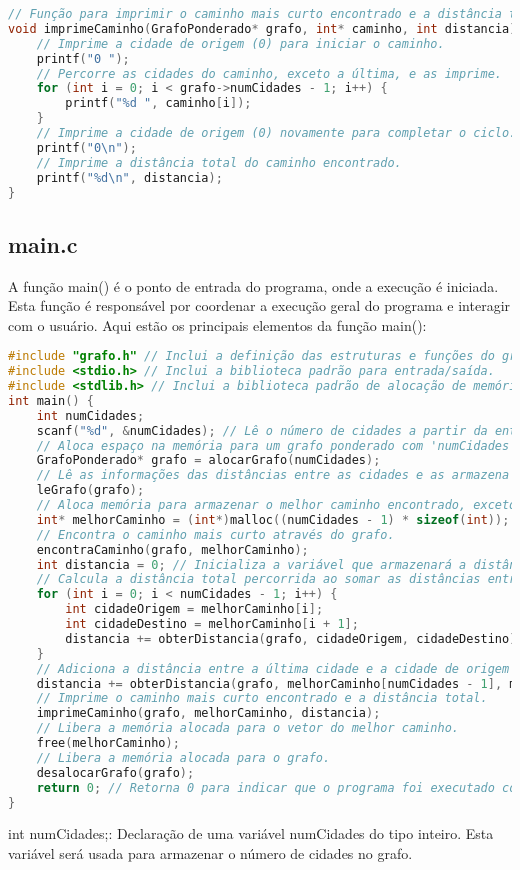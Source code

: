 \documentclass[12pt]{spieman}
\begin{document}
\begin{lstlisting}[language=C]
// Função para imprimir o caminho mais curto encontrado e a distância total.
void imprimeCaminho(GrafoPonderado* grafo, int* caminho, int distancia) {
    // Imprime a cidade de origem (0) para iniciar o caminho.
    printf("0 ");
    // Percorre as cidades do caminho, exceto a última, e as imprime.
    for (int i = 0; i < grafo->numCidades - 1; i++) {
        printf("%d ", caminho[i]);
    }
    // Imprime a cidade de origem (0) novamente para completar o ciclo.
    printf("0\n");
    // Imprime a distância total do caminho encontrado.
    printf("%d\n", distancia);
}
\end{lstlisting}
\subsection{main.c}
A função main() é o ponto de entrada do programa, onde a execução é iniciada. Esta função é responsável por coordenar a execução geral do programa e interagir com o usuário. Aqui estão os principais elementos da função main():
\begin{lstlisting}[language=C]
#include "grafo.h" // Inclui a definição das estruturas e funções do grafo.
#include <stdio.h> // Inclui a biblioteca padrão para entrada/saída.
#include <stdlib.h> // Inclui a biblioteca padrão de alocação de memória.
int main() {
    int numCidades;
    scanf("%d", &numCidades); // Lê o número de cidades a partir da entrada padrão.
    // Aloca espaço na memória para um grafo ponderado com 'numCidades'.
    GrafoPonderado* grafo = alocarGrafo(numCidades);
    // Lê as informações das distâncias entre as cidades e as armazena no grafo.
    leGrafo(grafo);
    // Aloca memória para armazenar o melhor caminho encontrado, exceto a cidade de origem.
    int* melhorCaminho = (int*)malloc((numCidades - 1) * sizeof(int));
    // Encontra o caminho mais curto através do grafo.
    encontraCaminho(grafo, melhorCaminho);
    int distancia = 0; // Inicializa a variável que armazenará a distância total do caminho.
    // Calcula a distância total percorrida ao somar as distâncias entre as cidades do caminho.
    for (int i = 0; i < numCidades - 1; i++) {
        int cidadeOrigem = melhorCaminho[i];
        int cidadeDestino = melhorCaminho[i + 1];
        distancia += obterDistancia(grafo, cidadeOrigem, cidadeDestino);
    }
    // Adiciona a distância entre a última cidade e a cidade de origem para fechar o ciclo.
    distancia += obterDistancia(grafo, melhorCaminho[numCidades - 1], melhorCaminho[0]);
    // Imprime o caminho mais curto encontrado e a distância total.
    imprimeCaminho(grafo, melhorCaminho, distancia);
    // Libera a memória alocada para o vetor do melhor caminho.
    free(melhorCaminho);
    // Libera a memória alocada para o grafo.
    desalocarGrafo(grafo);
    return 0; // Retorna 0 para indicar que o programa foi executado com sucesso.
}
\end{lstlisting}
int numCidades;: Declaração de uma variável numCidades do tipo inteiro. Esta variável será usada para armazenar o número de cidades no grafo.
\end{document}
